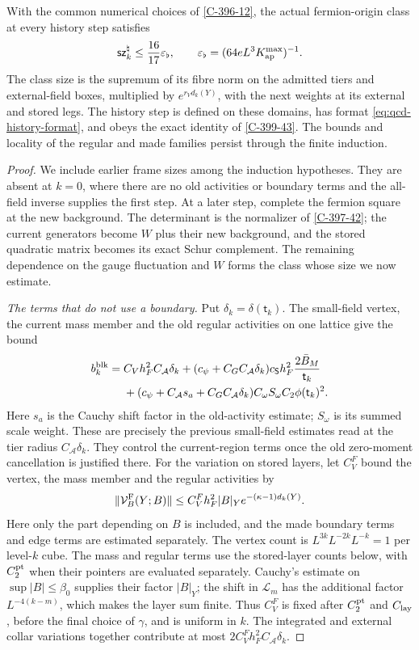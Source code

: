 \documentclass[11pt,letterpaper,reqno]{amsart}
\makeatletter
\theoremstyle{definition}
\newcommand{\ms@minorstart}{%
  \pushQED{\qed}\renewcommand{\qedsymbol}{$\blacksquare$}}
\newenvironment{proposition}[1][]{\ms@minorstart\ms@proposition[#1]}
  {\popQED\endms@proposition}
\theoremstyle{remark}
\makeatother
\begin{document}
\begin{proposition}[Closing the matter induction on histories]
\label{C-399-21}
With the common numerical choices of \cref{C-396-12}, the actual
fermion-origin class at every history step satisfies
\[
 \mathsf{sz}_k^\natural\le\frac{16}{17}\varepsilon_\flat,
 \qquad
 \varepsilon_\flat=(64eL^3K_{\rm ap}^{\max})^{-1}.
\]
The class size is the supremum of its fibre norm on
the admitted tiers and external-field boxes, multiplied
by $e^{r_Vd_k(Y)}$, with the next weights at its
external and stored legs. The history step is defined
on these domains, has format \eqref{eq:qcd-history-format},
and obeys the exact identity of \cref{C-399-43}.
The bounds and locality of the regular and made
families persist through the finite induction.
\end{proposition}
\begin{proof}
We include earlier frame sizes among the induction
hypotheses. They are absent at $k=0$, where there
are no old activities or boundary terms and the
all-field inverse supplies the first step.
At a later step, complete the fermion square at
the new background. The determinant is the
normalizer of \cref{C-397-42}; the current generators
become $W$ plus their new background, and the
stored quadratic matrix becomes its exact Schur
complement. The remaining dependence on the gauge
fluctuation and $W$ forms the class whose size
we now estimate.

\emph{The terms that do not use a boundary.}
Put $\delta_k=\delta(\mathsf t_k)$. The small-field
vertex, the current mass member and the old regular
activities on one lattice give the bound
\[
\begin{split}
 b_k^{\rm blk}={}&C_Vh_F^2C_{\mathcal A}\delta_k
 +(c_\psi+C_GC_{\mathcal A}\delta_k)c_{\mathsf S}h_F^2
                                   \frac{2\bar B_M}{\mathsf t_k}\\
 &+(c_\psi+C_{\mathcal A}s_a+C_GC_{\mathcal A}\delta_k)
                C_\omega S_\omega C_2\phi(\mathsf t_k)^2.
\end{split}
\]
Here $s_a$ is the Cauchy shift factor in the
old-activity estimate; $S_\omega$ is its summed
scale weight. These are precisely the previous
small-field estimates read at the tier radius
$C_{\mathcal A}\delta_k$.
They control the current-region terms once the
old zero-moment cancellation is justified there.
For the variation on stored layers, let $C_V^F$ bound
the vertex, the mass member and the regular activities by
\[
 \|\mathcal V_B^{\rm F}(Y;B)\|
 \le C_V^Fh_F^2|B|_Ye^{-(\kappa-1)d_k(Y)}.
\]
Here only the part depending on $B$ is included, and
the made boundary terms and edge terms are estimated separately.
The vertex count is $L^{3k}L^{-2k}L^{-k}=1$ per
level-$k$ cube. The mass and regular terms use the stored-layer
counts below, with $C_2^{\rm pt}$ when their pointers
are evaluated separately. Cauchy's estimate on
$\sup|B|\le\beta_0$ supplies their factor $|B|_Y$;
the shift in $\mathcal L_m$ has the additional factor
$L^{-4(k-m)}$, which makes the layer sum finite.
Thus $C_V^F$ is fixed after $C_2^{\rm pt}$ and $C_{\rm lay}$,
before the final choice of $\gamma$, and is uniform in $k$.
The integrated and external collar variations together
contribute at most $2C_V^Fh_F^2C_{\mathcal A}\delta_k$.


\end{proof}
\end{document}
